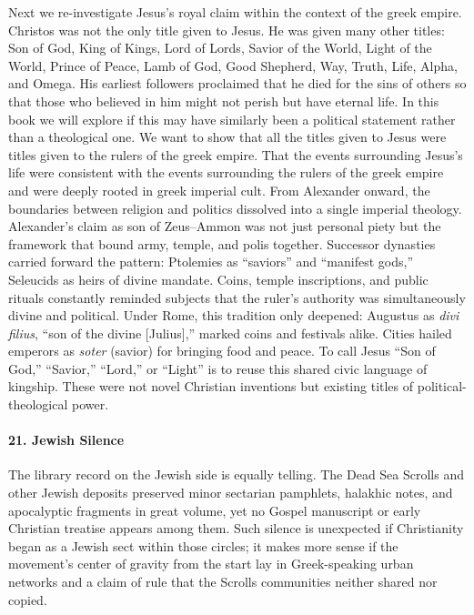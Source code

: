 
Next we re-investigate Jesus’s royal claim within the context of the greek empire.
Christos was not the only title given to Jesus.
He was given many other titles: Son of God, King of Kings, Lord of Lords, Savior of the World, Light of the World, Prince of Peace, Lamb of God, Good Shepherd, Way, Truth, Life, Alpha, and Omega.
His earliest followers proclaimed that he died for the sins of others so that those who believed in him might not perish but have eternal life.
In this book we will explore if this may have similarly been a political statement rather than a theological one.
We want to show that all the titles given to Jesus were titles given to the rulers of the greek empire.
That the events surrounding Jesus’s life were consistent with the events surrounding the rulers of the greek empire and were deeply rooted in greek imperial cult.
From Alexander onward, the boundaries between religion and politics dissolved into a single imperial theology.
Alexander’s claim as son of Zeus–Ammon was not just personal piety but the framework that bound army, temple, and polis together.
Successor dynasties carried forward the pattern: Ptolemies as “saviors” and “manifest gods,” Seleucids as heirs of divine mandate.
Coins, temple inscriptions, and public rituals constantly reminded subjects that the ruler’s authority was simultaneously divine and political.
Under Rome, this tradition only deepened: Augustus as \emph{divi filius}, “son of the divine [Julius],” marked coins and festivals alike.
Cities hailed emperors as \emph{soter} (savior) for bringing food and peace.
To call Jesus “Son of God,” “Savior,” “Lord,” or “Light” is to reuse this shared civic language of kingship.
These were not novel Christian inventions but existing titles of political-theological power.

\paragraph{21.
Jewish Silence}\label{par:jewish-silence}

The library record on the Jewish side is equally telling.
The Dead Sea Scrolls and other Jewish deposits preserved minor sectarian pamphlets, halakhic notes, and apocalyptic fragments in great volume, yet no Gospel manuscript or early Christian treatise appears among them.
Such silence is unexpected if Christianity began as a Jewish sect within those circles; it makes more sense if the movement’s center of gravity from the start lay in Greek-speaking urban networks and a claim of rule that the Scrolls communities neither shared nor copied.

